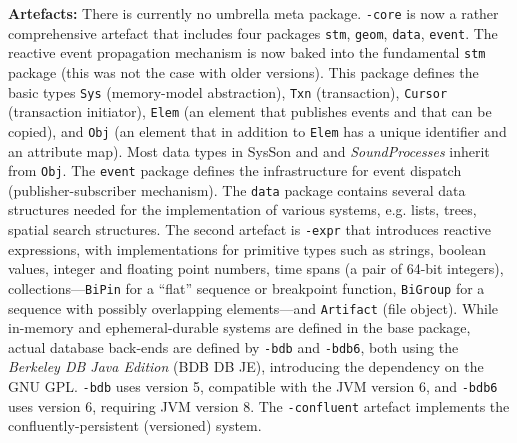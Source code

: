 \documentclass[11pt,a4paper]{article}
\newcommand{\software}[1]{\textit{#1}}
\newcommand{\sysson}[0]{SysSon}
\begin{document}
\textbf{Artefacts:} There is currently no umbrella meta package. \verb!-core! is now a rather comprehensive artefact that includes four packages \verb!stm!, \verb!geom!, \verb!data!, \verb!event!. The reactive event propagation mechanism is now baked into the fundamental \verb!stm! package (this was not the case with older versions). This package defines the basic types \verb!Sys! (memory-model abstraction), \verb!Txn! (transaction), \verb!Cursor! (transaction initiator), \verb!Elem! (an element that publishes events and that can be copied), and \verb!Obj! (an element that in addition to \verb!Elem! has a unique identifier and an attribute map). Most data types in \sysson{} and and \software{SoundProcesses} inherit from \verb!Obj!. The \verb!event! package defines the infrastructure for event dispatch (publisher-subscriber mechanism). The \verb!data! package contains several data structures needed for the implementation of various systems, e.g. lists, trees, spatial search structures. The second artefact is \verb!-expr! that introduces reactive expressions, with implementations for primitive types such as strings, boolean values, integer and floating point numbers, time spans (a pair of 64-bit integers), collections---\verb!BiPin! for a ``flat'' sequence or breakpoint function, \verb!BiGroup! for a sequence with possibly overlapping elements---and \verb!Artifact! (file object). While in-memory and ephemeral-durable systems are defined in the base package, actual database back-ends are defined by \verb!-bdb! and \verb!-bdb6!, both using the \software{Berkeley DB Java Edition} (BDB DB JE), introducing the dependency on the GNU GPL. \verb!-bdb! uses version 5, compatible with the JVM version 6, and \verb!-bdb6! uses version 6, requiring JVM version 8. The \verb!-confluent! artefact implements the confluently-persistent (versioned) system.
\end{document}
